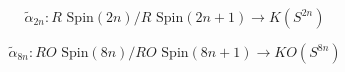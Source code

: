 $$\tilde{\alpha}_{2n} : R \text{ Spin}(2n)/R \text{ Spin}(2n + 1) \rightarrow K(S^{2n})$$

$$\tilde{\alpha}_{8n} : RO \text{ Spin}(8n)/RO \text{ Spin}(8n + 1) \rightarrow KO(S^{8n})$$
